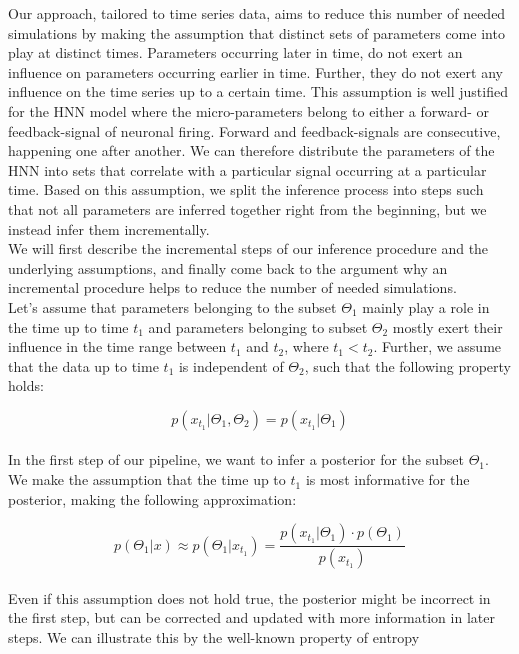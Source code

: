 \documentclass[12pt]{extreport}
\begin{document}
Our approach, tailored to time series data, aims to reduce this number of needed simulations by making the assumption that distinct sets of parameters come into play at distinct times. Parameters occurring later in time, do not exert an influence on parameters occurring earlier in time. Further, they do not exert any influence on the time series up to a certain time. This assumption is well justified for the HNN model where the micro-parameters belong to either a forward- or feedback-signal of neuronal firing. Forward and feedback-signals are consecutive, happening one after another. We can therefore distribute the parameters of the HNN into sets that correlate with a particular signal occurring at a particular time. Based on this assumption, we split the inference process into steps such that not all parameters are inferred together right from the beginning, but we instead infer them incrementally. \\

We will first describe the incremental steps of our inference procedure and the underlying assumptions, and finally come back to the argument why an incremental procedure helps to reduce the number of needed simulations.\\

Let's assume that parameters belonging to the subset $\Theta_1$ mainly play a role in the time up to time $t_1$ and parameters belonging to subset $\Theta_2$ mostly exert their influence in the time range between $t_1$ and $t_2$, where $t_1<t_2$. Further, we assume that the data up to time $t_1$ is independent of $\Theta_2$, such that the following property holds:

\begin{equation}
\label{prop31}
p(x_{t_1}|\Theta_1, \Theta_2) = p(x_{t_1}|\Theta_1)
\end{equation}\\

In the first step of our pipeline, we want to infer a posterior for the subset $\Theta_1$. We make the assumption that the time up to $t_1$ is most informative for the posterior, making the following approximation:

\begin{equation}
\label{prop32}
p(\Theta_1|x) \approx p(\Theta_1|x_{t_1}) = \frac{p(x_{t_1}|\Theta_1) \cdot p(\Theta_1)}{p(x_{t_1})}
\end{equation}\\

Even if this assumption does not hold true, the posterior might be incorrect in the first step, but can be corrected and updated with more information in later steps. We can illustrate this by the well-known property of entropy \citep{shannon1948mathematical}
\end{document}

